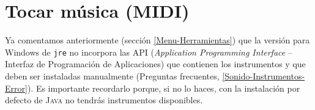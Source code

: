 \chapter{Tocar m\'usica (MIDI)}
   \label{Tocar-m\'usica}
    

Ya comentamos anteriormente (secci\'on \ref{Menu-Herramientas}) que la versi\'on
para Windows de \texttt{jre} no incorpora las API (\textit{Application Programming
Interface} -- Interfaz de Programaci\'on de Aplicaciones) que contienen los
instrumentos y que deben ser instaladas manualmente (Preguntas frecuentes, 
\ref{Sonido-Instrumentos-Error}). Es importante recordarlo porque, si no lo haces,
con la instalaci\'on por defecto de \textsc{Java} no tendr\'as instrumentos
disponibles. \\

